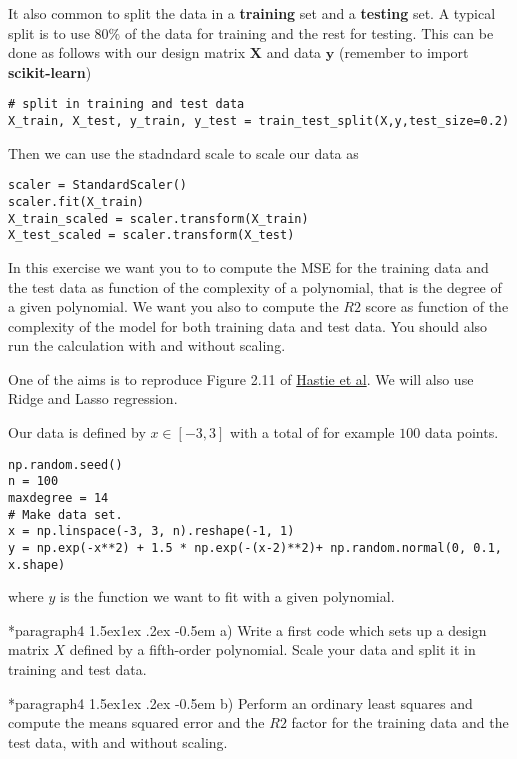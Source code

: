 \documentclass[%
oneside,                 %
final,                   %
10pt]{article}
\makeatletter
\newenvironment{doconceexercise}{}{}
\newcommand\subex{\@startsection*{paragraph}{4}{\z@}%
                  {1.5ex\@plus1ex \@minus.2ex}%
                  {-0.5em}%
                  {\normalfont\normalsize\bfseries}}
\makeatother
\begin{document}
\begin{doconceexercise}
It also common to split the data in a \textbf{training} set and a \textbf{testing} set. A typical split is to use $80\%$ of the data for training and the rest
for testing. This can be done as follows with our design matrix $\bm{X}$ and data $\bm{y}$ (remember to import \textbf{scikit-learn})
\begin{verbatim}
# split in training and test data
X_train, X_test, y_train, y_test = train_test_split(X,y,test_size=0.2)
\end{verbatim}
Then we can use the stadndard scale to scale our data as
\begin{verbatim}
scaler = StandardScaler()
scaler.fit(X_train)
X_train_scaled = scaler.transform(X_train)
X_test_scaled = scaler.transform(X_test)
\end{verbatim}


In this exercise we want you to to compute the MSE for the training
data and the test data as function of the complexity of a polynomial,
that is the degree of a given polynomial. We want you also to compute the $R2$ score as function of the complexity of the model for both training data and test data.  You should also run the calculation with and without scaling. 

One of 
the aims is to reproduce Figure 2.11 of \href{{https://github.com/CompPhysics/MLErasmus/blob/master/doc/Textbooks/elementsstat.pdf}}{Hastie et al}.
We will also use Ridge and Lasso regression. 


Our data is defined by $x\in [-3,3]$ with a total of for example $100$ data points.
\begin{verbatim}
np.random.seed()
n = 100
maxdegree = 14
# Make data set.
x = np.linspace(-3, 3, n).reshape(-1, 1)
y = np.exp(-x**2) + 1.5 * np.exp(-(x-2)**2)+ np.random.normal(0, 0.1, x.shape)
\end{verbatim}
where $y$ is the function we want to fit with a given polynomial.


\subex{a)}
Write a first code which sets up a design matrix $X$ defined by a fifth-order polynomial.  Scale your data and split it in training and test data.

\subex{b)}
Perform an ordinary least squares and compute the means squared error and the $R2$ factor for the training data and the test data, with and without scaling.


\end{doconceexercise}
\end{document}
